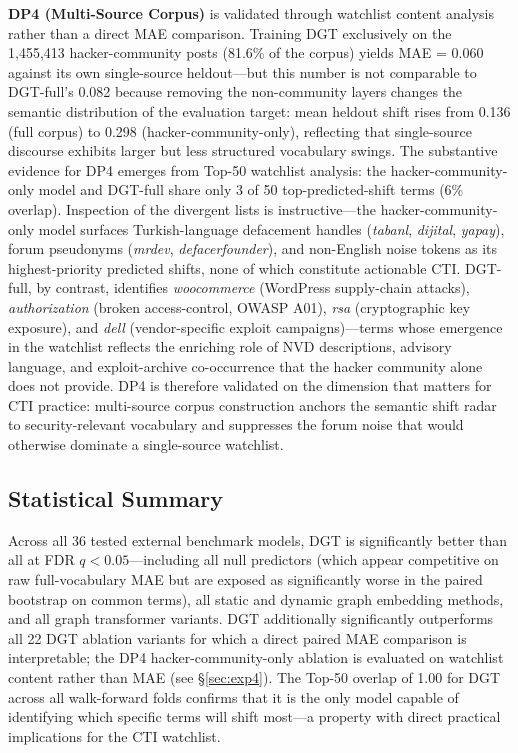 \documentclass[12pt]{article}
\begin{document}
\textbf{DP4 (Multi-Source Corpus)} is validated through watchlist content analysis rather than a direct MAE comparison. Training DGT exclusively on the 1,455,413 hacker-community posts (81.6\% of the corpus) yields MAE = 0.060 against its own single-source heldout---but this number is not comparable to DGT-full's 0.082 because removing the non-community layers changes the semantic distribution of the evaluation target: mean heldout shift rises from 0.136 (full corpus) to 0.298 (hacker-community-only), reflecting that single-source discourse exhibits larger but less structured vocabulary swings. The substantive evidence for DP4 emerges from Top-50 watchlist analysis: the hacker-community-only model and DGT-full share only 3 of 50 top-predicted-shift terms (6\% overlap). Inspection of the divergent lists is instructive---the hacker-community-only model surfaces Turkish-language defacement handles (\textit{tabanl}, \textit{dijital}, \textit{yapay}), forum pseudonyms (\textit{mrdev}, \textit{defacerfounder}), and non-English noise tokens as its highest-priority predicted shifts, none of which constitute actionable CTI. DGT-full, by contrast, identifies \textit{woocommerce} (WordPress supply-chain attacks), \textit{authorization} (broken access-control, OWASP A01), \textit{rsa} (cryptographic key exposure), and \textit{dell} (vendor-specific exploit campaigns)---terms whose emergence in the watchlist reflects the enriching role of NVD descriptions, advisory language, and exploit-archive co-occurrence that the hacker community alone does not provide. DP4 is therefore validated on the dimension that matters for CTI practice: multi-source corpus construction anchors the semantic shift radar to security-relevant vocabulary and suppresses the forum noise that would otherwise dominate a single-source watchlist.

\subsection{Statistical Summary}

Across all 36 tested external benchmark models, DGT is significantly better than all at FDR $q < 0.05$---including all null predictors (which appear competitive on raw full-vocabulary MAE but are exposed as significantly worse in the paired bootstrap on common terms), all static and dynamic graph embedding methods, and all graph transformer variants. DGT additionally significantly outperforms all 22 DGT ablation variants for which a direct paired MAE comparison is interpretable; the DP4 hacker-community-only ablation is evaluated on watchlist content rather than MAE (see §\ref{sec:exp4}). The Top-50 overlap of 1.00 for DGT across all walk-forward folds confirms that it is the only model capable of identifying which specific terms will shift most---a property with direct practical implications for the CTI watchlist.
\end{document}
